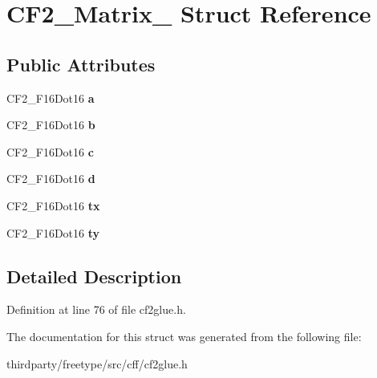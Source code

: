 \hypertarget{struct_c_f2___matrix__}{}\section{C\+F2\+\_\+\+Matrix\+\_\+ Struct Reference}
\label{struct_c_f2___matrix__}
\subsection*{Public Attributes}
\begin{DoxyCompactItemize}
\item 
\mbox{\label{struct_c_f2___matrix___ab7ce8f1b965018e81ae9234f6223a35d}} 
C\+F2\+\_\+\+F16\+Dot16 {\bfseries a}
\item 
\mbox{\label{struct_c_f2___matrix___a4b253a3a8ba005ca02345bc2da237952}} 
C\+F2\+\_\+\+F16\+Dot16 {\bfseries b}
\item 
\mbox{\label{struct_c_f2___matrix___a0914a2e750a0f32938ad80c8631865a3}} 
C\+F2\+\_\+\+F16\+Dot16 {\bfseries c}
\item 
\mbox{\label{struct_c_f2___matrix___ac49530a76400a299ce223b3ba6ba3d6a}} 
C\+F2\+\_\+\+F16\+Dot16 {\bfseries d}
\item 
\mbox{\label{struct_c_f2___matrix___ad9135f53c387d621b81d92a469e7021d}} 
C\+F2\+\_\+\+F16\+Dot16 {\bfseries tx}
\item 
\mbox{\label{struct_c_f2___matrix___a99f30c33da0eb4a820aa31566b217e51}} 
C\+F2\+\_\+\+F16\+Dot16 {\bfseries ty}
\end{DoxyCompactItemize}


\subsection{Detailed Description}


Definition at line 76 of file cf2glue.\+h.



The documentation for this struct was generated from the following file\+:\begin{DoxyCompactItemize}
\item 
thirdparty/freetype/src/cff/cf2glue.\+h\end{DoxyCompactItemize}
